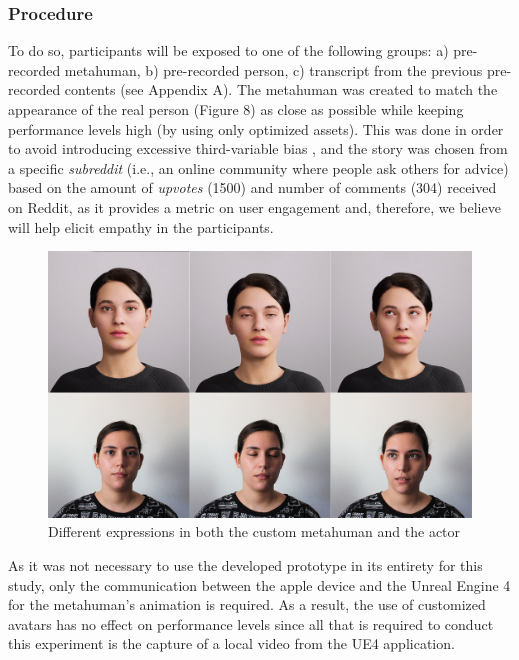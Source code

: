 \subsubsection{Procedure}
To do so, participants will be exposed to one of the following groups: a) pre-recorded metahuman, b) pre-recorded person, c) transcript from the previous pre-recorded contents (see Appendix A). The metahuman was created to match the appearance of the real person (Figure 8) as close as possible while keeping performance levels high (by using only optimized assets). This was done in order to avoid introducing excessive third-variable bias \cite{ROT19}, and the story was chosen from a specific \textit{subreddit} (i.e., an online community where people ask others for advice) based on the amount of \textit{upvotes} (1500) and number of comments (304) received on Reddit, as it provides a metric on user engagement and, therefore, we believe will help elicit empathy in the participants.

\begin{figure}[h!]
\includegraphics[width=\textwidth]{figures/personavatar.jpg}
\centering
\caption{Different expressions in both the custom metahuman and the actor}
\end{figure}

As it was not necessary to use the developed prototype in its entirety for this study, only the communication between the apple device and the Unreal Engine 4 for the metahuman's animation is required. As a result, the use of customized avatars has no effect on performance levels since all that is required to conduct this experiment is the capture of a local video from the UE4 application.

